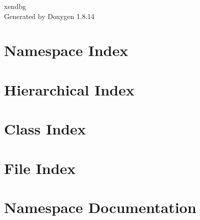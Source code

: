 \documentclass[twoside]{book}
\newcommand{\+}{\discretionary{\mbox{\scriptsize$\hookleftarrow$}}{}{}}
\newcommand{\clearemptydoublepage}{%
  \newpage{\pagestyle{empty}\cleardoublepage}%
}
\begin{document}
\hypersetup{pageanchor=false,
             bookmarksnumbered=true,
             pdfencoding=unicode
            }
\begin{titlepage}
\vspace*{7cm}
\begin{center}%
{\Large xendbg }\\
\vspace*{1cm}
{\large Generated by Doxygen 1.8.14}\\
\end{center}
\end{titlepage}
\clearemptydoublepage
{}
\tableofcontents
\clearemptydoublepage
{}
\hypersetup{pageanchor=true}

\chapter{Namespace Index}

\chapter{Hierarchical Index}

\chapter{Class Index}

\chapter{File Index}

\chapter{Namespace Documentation}




















\end{document}
